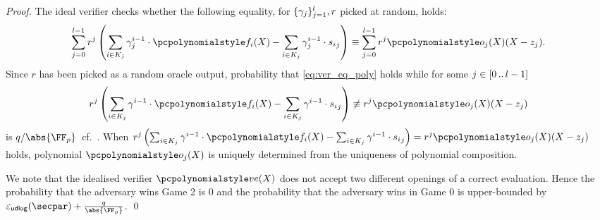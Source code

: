 \begin{proof}
  The ideal verifier checks whether the following equality, for $\{\gamma_j\}_{j = 1}^{l}, r$
  picked at random, holds:
  \begin{multline}
    \label{eq:ver_eq_poly}
    \sum_{j = 0}^{l - 1} r^{j}\left(\sum_{i \in K_j} \gamma_{j}^{i - 1} \cdot \p{f}_i(X) - \sum_{i \in K_j} \gamma_{j}^{i - 1} \cdot {s_i}_j \right) 
    \equiv \sum_{j = 0}^{l - 1} r^{j} \p{o_{j}}(X)(X - z_j).
  \end{multline}
  Since $r$ has been picked as a random oracle output, probability that
  \cref{eq:ver_eq_poly} holds while for some $j \in [0 \, .. \, l - 1]$
  \[
    r^j \left(\sum_{i \in K_j} \gamma^{i - 1} \cdot \p{f}_i(X) - \sum_{i \in K_j}
    \gamma^{i - 1} \cdot {s_i}_j \right) \not\equiv r^j \p{o_j}(X)(X - z_j)
  \]
  is $\infrac{q}{\abs{\FF_p}}$~cf.~\cite{EPRINT:GabWilCio19}. 
  When \(
    r^j \left(\sum_{i \in K_j} \gamma^{i - 1} \cdot \p{f}_i(X) - \sum_{i \in K_j}
    \gamma^{i - 1} \cdot {s_i}_j \right) = r^j \p{o_j}(X)(X - z_j)
  \)
  holds, polynomial $\p{o_j}(X)$ is uniquely determined from the uniqueness of
  polynomial composition. 

  We note that the idealised verifier $\vereq(X)$ does not accept two different openings of a correct evaluation. Hence the probability that the adversary wins Game 2 is $0$ and the probability that the adversary wins in Game 0 is upper-bounded by \(\epsudlog (\secpar) + \frac{q}{\abs{\FF_p}}\).
    \qed
\end{proof}